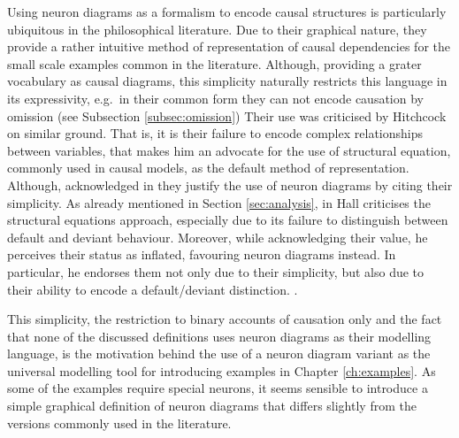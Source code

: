 \documentclass[11pt,a4paper]{book}
\theoremstyle{definition}
\theoremstyle{definition}
\theoremstyle{definition}
\theoremstyle{remark}
\begin{document}
Using neuron diagrams as a formalism to encode causal structures is particularly ubiquitous in the philosophical literature. 
Due to their graphical nature, they provide a rather intuitive method of representation of causal dependencies for the small scale examples common in the literature.
Although, providing a grater vocabulary as causal diagrams, this simplicity naturally restricts this language in its expressivity, e.g.\ in their common form they can not encode causation by omission (see Subsection \ref{subsec:omission})
Their use was criticised by Hitchcock \cite{hitchcock2009structural} on similar ground. That is, it is their failure to encode complex relationships between variables, that makes him an advocate for the use of structural equation, commonly used in causal models, as the default method of representation. Although, acknowledged in \cite{erwig2010causal} they justify the use of neuron diagrams by citing their simplicity. 
As already mentioned in Section \ref{sec:analysis}, in \parencite{hall2007structural} Hall criticises the structural equations approach, especially due to its failure to distinguish between default and deviant behaviour. Moreover, while acknowledging their value, he perceives their status as inflated, favouring neuron diagrams instead. In particular, he endorses them not only due to their simplicity, but also due to their ability to encode a default/deviant distinction.
\parencite{baumgartner2013regularity,erwig2010causal,beckers2016general}.  

This simplicity, the restriction to binary accounts of causation only and the fact that none of the discussed definitions uses neuron diagrams as their modelling language, is the motivation behind the use of a neuron diagram variant as the universal modelling tool for introducing examples in Chapter \ref{ch:examples}. As some of the examples require special neurons, it seems sensible to introduce a simple graphical definition of neuron diagrams that differs slightly from the versions commonly used in the literature. 
\end{document}
